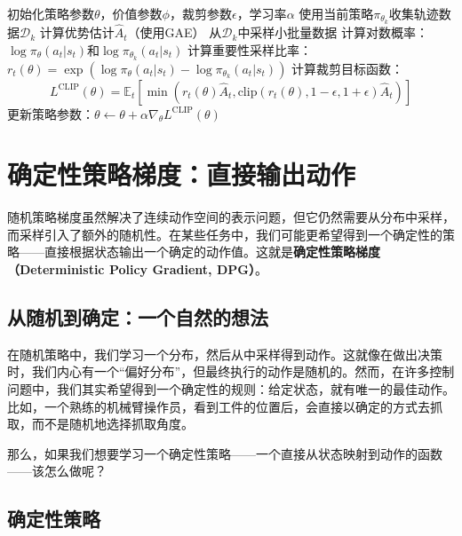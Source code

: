 \documentclass[lang=cn,zihao=-4,a4paper,fontset=windows]{beautybook}
\begin{document}
\begin{algorithm}[H]
\caption{PPO for Continuous Control}
\begin{algorithmic}[1]
\REQUIRE 初始化策略参数$\theta$，价值参数$\phi$，裁剪参数$\epsilon$，学习率$\alpha$
    \STATE 使用当前策略$\pi_{\theta_k}$收集轨迹数据$\mathcal{D}_k$
    \STATE 计算优势估计$\hat{A}_t$（使用GAE）
        \STATE 从$\mathcal{D}_k$中采样小批量数据
        \STATE 计算对数概率：$\log \pi_\theta(a_t|s_t)$和$\log \pi_{\theta_k}(a_t|s_t)$
        \STATE 计算重要性采样比率：$r_t(\theta) = \exp(\log \pi_\theta(a_t|s_t) - \log \pi_{\theta_k}(a_t|s_t))$
        \STATE 计算裁剪目标函数：
        \[
        L^{\text{CLIP}}(\theta) = \mathbb{E}_t\left[\min\left(r_t(\theta)\hat{A}_t, \text{clip}(r_t(\theta), 1-\epsilon, 1+\epsilon)\hat{A}_t\right)\right]
        \]
        \STATE 更新策略参数：$\theta \leftarrow \theta + \alpha \nabla_\theta L^{\text{CLIP}}(\theta)$
    \ENDFOR
\ENDFOR
\end{algorithmic}
\end{algorithm}

\section{确定性策略梯度：直接输出动作}

随机策略梯度虽然解决了连续动作空间的表示问题，但它仍然需要从分布中采样，而采样引入了额外的随机性。在某些任务中，我们可能更希望得到一个确定性的策略——直接根据状态输出一个确定的动作值。这就是\textbf{确定性策略梯度（Deterministic Policy Gradient, DPG）}。

\subsection{从随机到确定：一个自然的想法}

在随机策略中，我们学习一个分布，然后从中采样得到动作。这就像在做出决策时，我们内心有一个“偏好分布”，但最终执行的动作是随机的。然而，在许多控制问题中，我们其实希望得到一个确定性的规则：给定状态，就有唯一的最佳动作。比如，一个熟练的机械臂操作员，看到工件的位置后，会直接以确定的方式去抓取，而不是随机地选择抓取角度。

那么，如果我们想要学习一个确定性策略——一个直接从状态映射到动作的函数——该怎么做呢？

\subsection{确定性策略}
\end{document}
